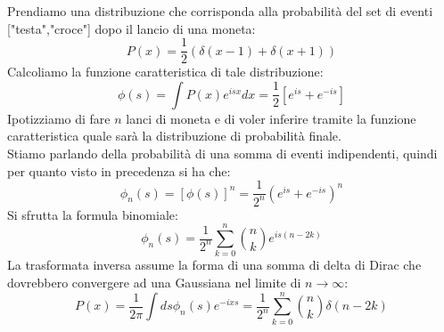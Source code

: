 \begin{exmp}
    Prendiamo una distribuzione che corrisponda alla probabilità del set di eventi ["testa","croce"] dopo il lancio di una moneta:
    \[
        P(x) = \frac{1}{2}\left( \delta(x-1) + \delta(x+1) \right) 
    \]
    Calcoliamo la funzione caratteristica di tale distribuzione:
    \[
	\phi(s) = \int P(x) e^{isx} dx = \frac{1}{2}\left[ e^{is} + e^{-is} \right] 
    \]
    Ipotizziamo di fare $n$ lanci di moneta e di voler inferire tramite la funzione caratteristica quale sarà la distribuzione di probabilità finale. \\
    Stiamo parlando della probabilità di una somma di eventi indipendenti, quindi per quanto visto in precedenza si ha che:
    \[
	\phi_n(s) = \left[ \phi(s) \right] ^n = \frac{1}{2^n} \left( e^{is} + e^{-is} \right)^n 
    \]
    Si sfrutta la formula binomiale:
    \[
	\phi_n(s) = \frac{1}{2^n}\sum_{k = 0}^{n}\binom{n}{k} e^{is(n-2k)}
    \]
    La trasformata inversa assume la forma di una somma di delta di Dirac che dovrebbero convergere ad una Gaussiana nel limite di $n\to\infty$:
    \[
	P(x) = \frac{1}{2\pi}\int ds \phi_n(s) e^{-ixs} = \frac{1}{2^n} \sum_{k = 0}^{n} \binom{n}{k}\delta(n-2k)
    \]
\end{exmp}
\clearpage
